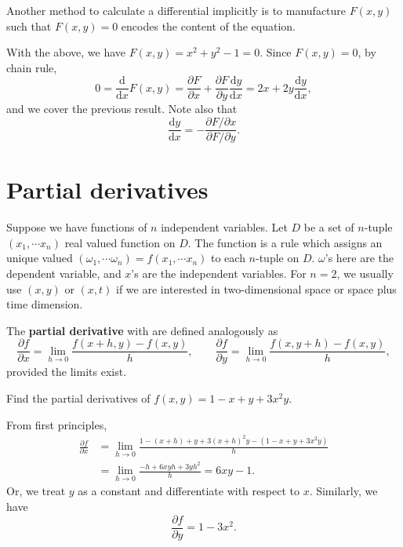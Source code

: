 \documentclass[letter-paper]{tufte-book}
\newenvironment{example}[1][Example]{\begin{trivlist}
\item[\hskip \labelsep {\bfseries #1}]}{\end{trivlist}}
\newcommand{\dy}{\partial}
\newcommand{\ddy}[2]{\frac{\dy#1}{\dy#2}}
\newcommand\Def[1]{\textbf{#1}}
\begin{document}
Another method to calculate a differential implicitly is to manufacture $F(x,y)$
such that $F(x,y)=0$ encodes the content of the equation.
\begin{example}
  With the above, we have $F(x,y)=x^2+y^2-1=0$. Since $F(x,y)=0$, by chain rule,
  \begin{equation*}
    0=\frac{\mathrm{d}}{\mathrm{d}x}F(x,y)=
    \ddy{F}{x}+\ddy{F}{y}\frac{\mathrm{d}y}{\mathrm{d}x}=
    2x+2y\frac{\mathrm{d}y}{\mathrm{d}x},
  \end{equation*}
  and we cover the previous result. Note also that
  \begin{equation*}
    \frac{\mathrm{d}y}{\mathrm{d}x}=-\frac{\dy F/\dy x}{\dy F/\dy y}.
  \end{equation*}
\end{example}


\section{Partial derivatives}

Suppose we have functions of $n$ independent variables. Let $D$ be a set of
$n$-tuple $(x_1,\cdots x_n)$ real valued function on $D$. The function is a rule
which assigns an unique valued $(\omega_1,\cdots\omega_n)=f(x_1,\cdots x_n)$ to
each $n$-tuple on $D$. $\omega$'s here are the dependent variable, and $x$'s are
the independent variables. For $n=2$, we usually use $(x,y)$ or $(x,t)$ if we
are interested in two-dimensional space or space plus time dimension.

The \Def{partial derivative} with are defined analogously as
\begin{equation*}
  \ddy{f}{x}=\lim_{h\to0}\frac{f(x+h,y)-f(x,y)}{h},\qquad
  \ddy{f}{y}=\lim_{h\to0}\frac{f(x,y+h)-f(x,y)}{h},
\end{equation*}
provided the limits exist.
\begin{example}
  Find the partial derivatives of $f(x,y)=1-x+y+3x^2 y$.
  
  From first principles,
  \begin{align*}
    \ddy{f}{x} &= \lim_{h\to0}\frac{1-(x+h)+y+3(x+h)^2 y-(1-x+y+3x^2y)}{h} \\
      &= \lim_{h\to0}\frac{-h + 6xy h + 3y h^2}{h} = 6xy-1.
  \end{align*}
  Or, we treat $y$ as a constant and differentiate with respect to $x$.
  Similarly, we have
  \begin{equation*}
    \ddy{f}{y}=1-3x^2.
  \end{equation*}
\end{example}
\end{document}
